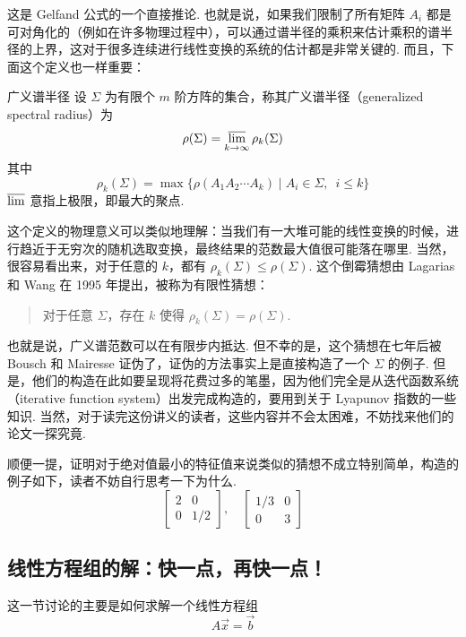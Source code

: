 这是 Gelfand 公式的一个直接推论. 也就是说，如果我们限制了所有矩阵 $A_i$ 都是可对角化的（例如在许多物理过程中），可以通过谱半径的乘积来估计乘积的谱半径的上界，这对于很多连续进行线性变换的系统的估计都是非常关键的. 而且，下面这个定义也一样重要：

\begin{definition}{广义谱半径}{}
    设 $\Sigma$ 为有限个 $m$ 阶方阵的集合，称其广义谱半径（generalized spectral radius）为
    \[ \rho(\Sigma) = \varlimsup_{k \to \infty} \rho_k(\Sigma) \]
    其中
    \[ \rho_k(\Sigma) = \max\{\rho(A_1A_2 \cdots A_k) \mid A_i \in \Sigma,\enspace i \leqslant k\} \]
    $\varlimsup$ 意指上极限，即最大的聚点.
\end{definition}

这个定义的物理意义可以类似地理解：当我们有一大堆可能的线性变换的时候，进行趋近于无穷次的随机选取变换，最终结果的范数最大值很可能落在哪里. 当然，很容易看出来，对于任意的 $k$，都有 $\rho_k(\Sigma) \leqslant \rho(\Sigma)$. 这个倒霉猜想由 Lagarias 和 Wang 在 1995 年提出，被称为有限性猜想：

\begin{quote}
    \kaishu
    对于任意 $\Sigma$，存在 $k$ 使得 $\rho_k(\Sigma) = \rho(\Sigma)$.
\end{quote}

也就是说，广义谱范数可以在有限步内抵达. 但不幸的是，这个猜想在七年后被 Bousch 和 Mairesse 证伪了，证伪的方法事实上是直接构造了一个 $\Sigma$ 的例子. 但是，他们的构造在此如要呈现将花费过多的笔墨，因为他们完全是从迭代函数系统（iterative function system）出发完成构造的，要用到关于 Lyapunov 指数的一些知识. 当然，对于读完这份讲义的读者，这些内容并不会太困难，不妨找来他们的论文一探究竟.

顺便一提，证明对于绝对值最小的特征值来说类似的猜想不成立特别简单，构造的例子如下，读者不妨自行思考一下为什么.
\[
    \begin{bmatrix}
        2 & 0 \\ 0 & 1/2
    \end{bmatrix}, \quad \begin{bmatrix}
        1/3 & 0 \\ 0 & 3
    \end{bmatrix}
\]

\subsection{线性方程组的解：快一点，再快一点！}

这一节讨论的主要是如何求解一个线性方程组
\[ A\vec{x} = \vec{b} \]

